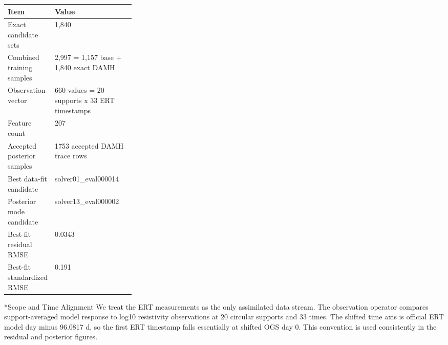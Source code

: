 \documentclass[10pt]{article}
\makeatletter
\renewcommand{\section}{\@startsection{section}{1}{0pt}{1.2em}{0.6em}{\large\bfseries\color{HeadingBlue}}}
\makeatother
\begin{document}
\begin{table}[H]
\centering
\small
\begin{tabularx}{\linewidth}{>{\raggedright\arraybackslash}p{0.29\linewidth} X}
\toprule
\rowcolor{TableFill}\textbf{Item} & \textbf{Value}\\
\midrule
Exact candidate sets & 1,840 \\
Combined training samples & 2,997 = 1,157 base + 1,840 exact DAMH \\
Observation vector & 660 values = 20 supports x 33 ERT timestamps \\
Feature count & 207 \\
Accepted posterior samples & 1753 accepted DAMH trace rows \\
Best data-fit candidate & solver01\_\allowbreak{}eval000014 \\
Posterior mode candidate & solver13\_\allowbreak{}eval000002 \\
Best-fit residual RMSE & 0.0343 \\
Best-fit standardized RMSE & 0.191 \\
\bottomrule
\end{tabularx}
\end{table}


\vspace{0.3em}
\noindent{}
\vspace{0.5em}


\clearpage
\section*{Scope and Time Alignment}
We treat the ERT measurements as the only assimilated data stream. The observation operator compares support-averaged model response to log10 resistivity observations at 20 circular supports and 33 times. The shifted time axis is official ERT model day minus 96.0817 d, so the first ERT timestamp falls essentially at shifted OGS day 0. This convention is used consistently in the residual and posterior figures.
\end{document}
